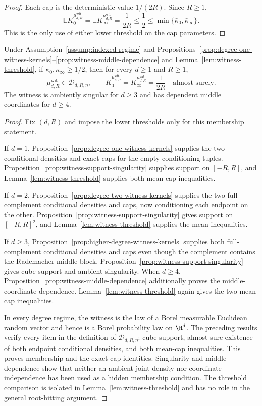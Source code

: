 \begin{proof}
Each cap is the deterministic value $1/(2R)$.  Since $R\geq1$,
\[
\mathbb E K_0^{\mu^{\mathrm{wit}}_{d,R}}
=\mathbb E K_\infty^{\mu^{\mathrm{wit}}_{d,R}}
=\frac1{2R}
\leq\frac12
\leq\min\{\bar\kappa_0,\bar\kappa_\infty\}.
\]
This is the only use of either lower threshold on the cap parameters.
\end{proof}

\begin{proposition}
\label{prop:witness-membership}
Under Assumption~\ref{assump:indexed-regime} and
Propositions~\ref{prop:degree-one-witness-kernels}--\ref{prop:witness-middle-dependence}
and Lemma~\ref{lem:witness-threshold}, if
$\bar\kappa_0,\bar\kappa_\infty\geq1/2$, then for every $d\geq1$ and
$R\geq1$,
\[
\mu^{\mathrm{wit}}_{d,R}\in\mathcal D_{d,R,\eta},
\qquad
K_0^{\mu^{\mathrm{wit}}_{d,R}}
=K_\infty^{\mu^{\mathrm{wit}}_{d,R}}
=\frac1{2R}\quad\text{almost surely}.
\]
The witness is ambiently singular for $d\geq3$ and has dependent middle
coordinates for $d\geq4$.
\end{proposition}

\begin{proof}
Fix $(d,R)$ and impose the lower thresholds only for this membership
statement.

If $d=1$, Proposition~\ref{prop:degree-one-witness-kernels} supplies the two
conditional densities and exact caps for the empty conditioning tuples.
Proposition~\ref{prop:witness-support-singularity} supplies support on
$[-R,R]$, and Lemma~\ref{lem:witness-threshold} supplies both mean-cap
inequalities.

If $d=2$, Proposition~\ref{prop:degree-two-witness-kernels} supplies the two
full-complement conditional densities and caps, now conditioning each
endpoint on the other.  Proposition~\ref{prop:witness-support-singularity}
gives support on $[-R,R]^2$, and Lemma~\ref{lem:witness-threshold} supplies
the mean inequalities.

If $d\geq3$, Proposition~\ref{prop:higher-degree-witness-kernels} supplies
both full-complement conditional densities and caps even though the
complement contains the Rademacher middle block.
Proposition~\ref{prop:witness-support-singularity} gives cube support and
ambient singularity.  When $d\geq4$,
Proposition~\ref{prop:witness-middle-dependence} additionally proves the
middle-coordinate dependence.  Lemma~\ref{lem:witness-threshold} again gives
the two mean-cap inequalities.

In every degree regime, the witness is the law of a Borel measurable
Euclidean random vector and hence is a Borel probability law on $\R^d$.  The
preceding results verify every item in the definition of
$\mathcal D_{d,R,\eta}$: cube support, almost-sure existence of both endpoint
conditional densities, and both mean-cap inequalities.  This proves
membership and the exact cap identities.  Singularity and middle dependence
show that neither an ambient joint density nor coordinate independence has
been used as a hidden membership condition.  The threshold comparison is
isolated in Lemma~\ref{lem:witness-threshold} and has no role in the general
root-hitting argument.
\end{proof}

